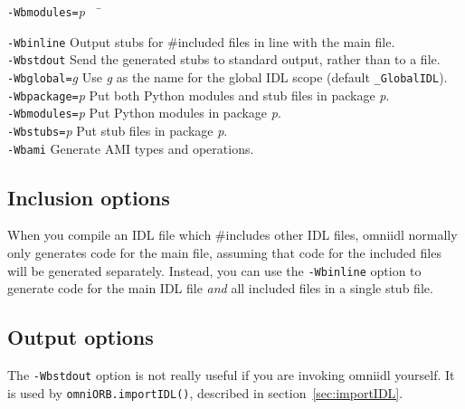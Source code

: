 \documentclass[11pt,oneside,a4paper]{book}
\newcommand{\module}[1]{\texttt{#1}}
\newcommand{\op}[1]{\texttt{#1()}}
\newcommand{\cmdline}[1]{\texttt{#1}}
\begin{document}
\begin{tabbing}

\cmdline{-Wbmodules=}\textit{p}~~ \= \kill

\cmdline{-Wbinline}
     \> Output stubs for \#included files in line with the main
        file.\\

\cmdline{-Wbstdout}
     \> Send the generated stubs to standard output, rather than to a
        file.\\

\cmdline{-Wbglobal=}\textit{g}
     \> Use \textit{g} as the name for the global IDL scope (default
        \module{\_GlobalIDL}).\\

\cmdline{-Wbpackage=}\textit{p}
     \> Put both Python modules and stub files in package
        \textit{p}.\\

\cmdline{-Wbmodules=}\textit{p}
     \> Put Python modules in package \textit{p}.\\

\cmdline{-Wbstubs=}\textit{p}
     \> Put stub files in package \textit{p}.\\

\cmdline{-Wbami}
     \> Generate AMI types and operations.\\

\end{tabbing}


\subsection{Inclusion options}

When you compile an IDL file which \#includes other IDL files, omniidl
normally only generates code for the main file, assuming that code for
the included files will be generated separately. Instead, you can use
the \cmdline{-Wbinline} option to generate code for the main IDL file
\emph{and} all included files in a single stub file.


\subsection{Output options}

The \cmdline{-Wbstdout} option is not really useful if you are
invoking omniidl yourself. It is used by \op{omniORB.importIDL},
described in section~\ref{sec:importIDL}.
\end{document}
